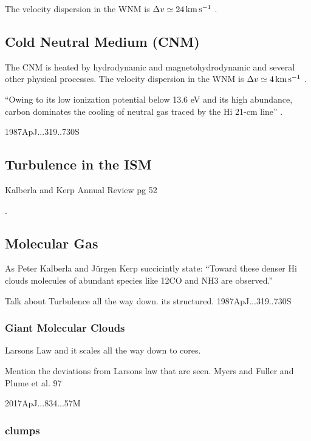 \documentclass[../dissertation.tex]{subfiles}
\begin{document}
The velocity dispersion in the WNM is $\Delta v \simeq 24 \,\rm km\,s^{-1}$ \citep[p. 49]{2009ARA&A..47...27K}.


\subsection{Cold Neutral Medium (CNM)}
The CNM is heated by hydrodynamic and magnetohydrodynamic and several other physical processes.
The velocity dispersion in the WNM is $\Delta v \simeq 4 \,\rm km\,s^{-1}$ \citep[p. 49]{2009ARA&A..47...27K}.

``Owing to its low ionization potential below 13.6 eV and its high abundance, carbon dominates the cooling of neutral gas traced by the Hi 21-cm line'' \citep[p. 48]{2009ARA&A..47...27K}.



1987ApJ...319..730S

\subsection{Turbulence in the ISM}
Kalberla and Kerp Annual Review pg 52

\citep[p. 52]{2009ARA&A..47...27K}.


\subsection{Molecular Gas}
As Peter Kalberla and J{\"u}rgen Kerp succicintly state: 
``Toward these denser Hi clouds molecules of abundant species like 12CO and NH3 are observed.''\citep[p. 47]{2009ARA&A..47...27K}


Talk about Turbulence all the way down. its structured.
1987ApJ...319..730S


\subsubsection{Giant Molecular Clouds}
Larsons Law and it scales all the way down to cores.

Mention the deviations from Larsons law that are seen. Myers and Fuller and Plume et al. 97

2017ApJ...834...57M
\subsubsection{clumps}
\end{document}
